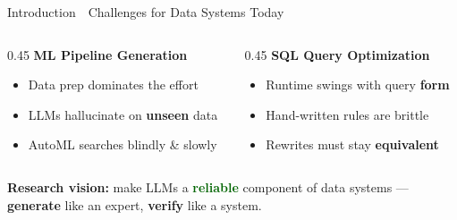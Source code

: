 \documentclass[aspectratio=169]{beamer}
\newcommand{\hred}[1]{\textcolor{tug}{\textbf{#1}}}
\newcommand{\hgreen}[1]{\textcolor{darkgreen}{\textbf{#1}}}
\newcommand{\hblue}[1]{\textcolor{tugb}{\textbf{#1}}}
\newcommand{\apptitle}[3]{%
  \textcolor{#1}{#2}~\textcolor{black!30}{\textbar}~#3}
\begin{document}
\begin{frame}{\apptitle{black!60}{Introduction}{Challenges for Data Systems Today}}
  \footnotesize
\vspace{1mm}
\begin{columns}[T]
\begin{column}{0.45\textwidth}
  \textbf{\hblue{ML Pipeline Generation}}\\[3pt]
  \begin{itemize}\setlength\itemsep{3pt}
    \item Data prep dominates the effort
    \item LLMs hallucinate on \textbf{unseen} data
    \item AutoML searches blindly \& slowly
  \end{itemize}
\end{column}
\begin{column}{0.45\textwidth}
  \textbf{\hred{SQL Query Optimization}}\\[3pt]
  \begin{itemize}\setlength\itemsep{3pt}
    \item Runtime swings with query \textbf{form}
    \item Hand-written rules are brittle
    \item Rewrites must stay \textbf{equivalent}
  \end{itemize}
\end{column}
\end{columns}
\vspace{6mm}
\pause
\begin{exampleblock}{}
  \vspace{2mm}
  \centering\normalsize
  \textbf{Research vision:} make LLMs a \hgreen{reliable} component of data systems ---\\[2pt]
  \textbf{generate} like an expert, \textbf{verify} like a system.
  \vspace{2mm}
\end{exampleblock}
\end{frame}
\end{document}
